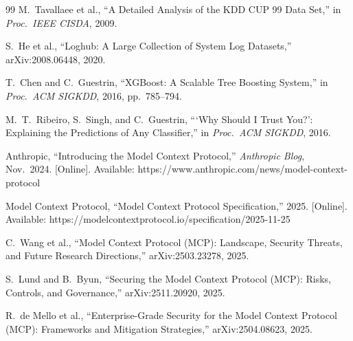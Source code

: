 \documentclass[11pt,conference]{IEEEtran}
\begin{document}
\begin{thebibliography}{99}
M.\ Tavallaee et al., ``A Detailed Analysis of the KDD CUP 99 Data Set,'' in \textit{Proc.\ IEEE CISDA}, 2009.

S.\ He et al., ``Loghub: A Large Collection of System Log Datasets,'' arXiv:2008.06448, 2020.

T.\ Chen and C.\ Guestrin, ``XGBoost: A Scalable Tree Boosting System,'' in \textit{Proc.\ ACM SIGKDD}, 2016, pp.\ 785--794.

M.\ T.\ Ribeiro, S.\ Singh, and C.\ Guestrin, ```Why Should I Trust You?': Explaining the Predictions of Any Classifier,'' in \textit{Proc.\ ACM SIGKDD}, 2016.

Anthropic, ``Introducing the Model Context Protocol,'' \textit{Anthropic Blog}, Nov.\ 2024. [Online]. Available: https://www.anthropic.com/news/model-context-protocol

Model Context Protocol, ``Model Context Protocol Specification,'' 2025. [Online]. Available: https://modelcontextprotocol.io/specification/2025-11-25

C.\ Wang et al., ``Model Context Protocol (MCP): Landscape, Security Threats, and Future Research Directions,'' arXiv:2503.23278, 2025.

S.\ Lund and B.\ Byun, ``Securing the Model Context Protocol (MCP): Risks, Controls, and Governance,'' arXiv:2511.20920, 2025.

R.\ de Mello et al., ``Enterprise-Grade Security for the Model Context Protocol (MCP): Frameworks and Mitigation Strategies,'' arXiv:2504.08623, 2025.

\end{thebibliography}

\balance
\end{document}
